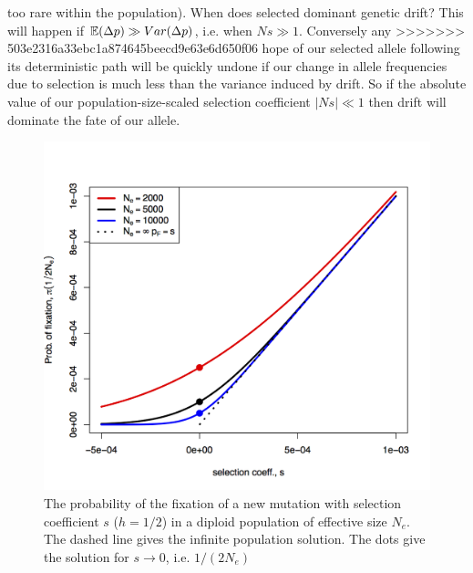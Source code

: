 too rare within the population). When does selected
dominant genetic drift? This will happen if $\mathbb{E}(\Delta p) \gg Var(\Delta p)$, i.e. when $Ns \gg 1$. Conversely any
>>>>>>> 503e2316a33ebc1a874645beecd9e63e6d650f06
hope of our selected allele following its deterministic path will be quickly undone if our change in allele frequencies due to selection is
much less than the variance induced by drift. So if the absolute value
of our population-size-scaled selection coefficient $| Ns| \ll 1$ then
drift will dominate the fate of our allele. \\
\begin{figure}
\begin{center}
\includegraphics[width=0.9 \textwidth]{figures/prob_fix_diffusion.png}
\end{center}
\caption{The probability of the fixation of a new mutation with
  selection coefficient $s$ ($h=1/2$) in a diploid population of effective
  size $N_e$. The dashed line gives the infinite population
  solution. The dots give the solution for $s \rightarrow 0$, i.e. $1/(2N_e)$} \label{fig:prob_fix_diffusion}
\end{figure}


